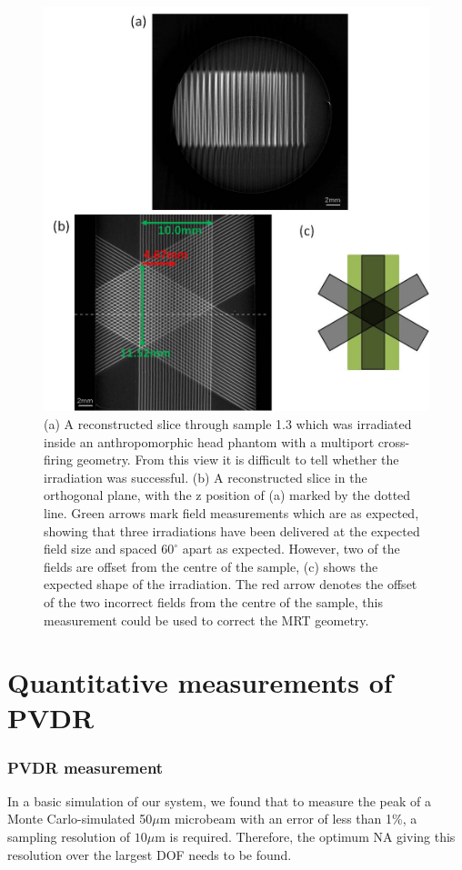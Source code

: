 	
	\begin{figure}
		\centering
		\includegraphics[width=0.9\linewidth]{mrt_img/mrt_Fig4}
		\caption{(a) A reconstructed slice through sample 1.3 which was irradiated inside an anthropomorphic head phantom with a multiport cross-firing geometry. From this view it is difficult to tell whether the irradiation was successful. (b) A reconstructed slice in the orthogonal plane, with the z position of (a) marked by the dotted line. Green arrows mark field measurements which are as expected, showing that three irradiations have been delivered at the expected field size and spaced $60^{\circ}$ apart as expected. However, two of the fields are offset from the centre of the sample, (c) shows the expected shape of the irradiation. The red arrow denotes the offset of the two incorrect fields from the centre of the sample, this measurement could be used to correct the MRT geometry.}
		\label{fig:Fig4L7}
	\end{figure}
	
	
	
	
	\section{Quantitative measurements of PVDR}
	\label{sec:quantPVDR}
	
	
	\subsubsection{PVDR measurement}
	In a basic simulation of our system, we found that to measure the peak of a Monte Carlo-simulated 50$\mu$m microbeam with an error of less than 1\%, a sampling resolution of $10\mu$m is required. Therefore, the optimum NA giving this resolution over the largest DOF needs to be found.  
	
